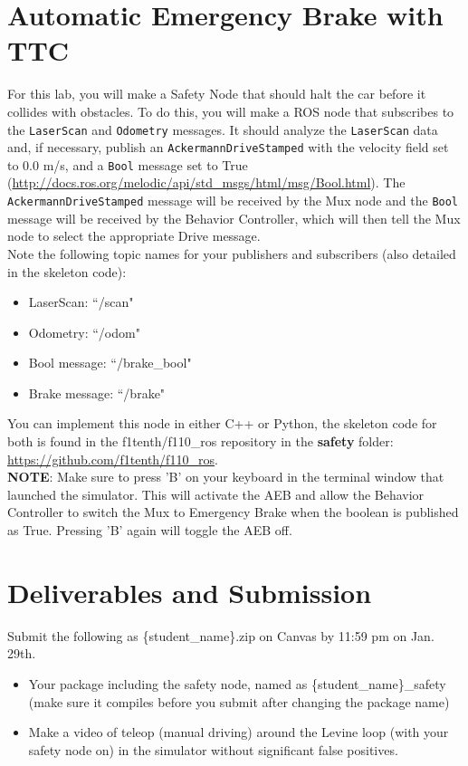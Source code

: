\documentclass[letter]{article}
\begin{document}
\section{Automatic Emergency Brake with TTC}
For this lab, you will make a Safety Node that should halt the car before it collides with obstacles. To do this, you will make a ROS node that subscribes to the \texttt{LaserScan} and \texttt{Odometry} messages. It should analyze the \texttt{LaserScan} data and, if necessary, publish an \texttt{AckermannDriveStamped} with the velocity field set to 0.0 m/s, and a \texttt{Bool} message set to True (\href{http://docs.ros.org/melodic/api/std_msgs/html/msg/Bool.html}{http://docs.ros.org/melodic/api/std\_msgs/html/msg/Bool.html}). The \texttt{AckermannDriveStamped} message will be received by the Mux node and the \texttt{Bool} message will be received by the Behavior Controller, which will then tell the Mux node to select the appropriate Drive message.\\

Note the following topic names for your publishers and subscribers (also detailed in the skeleton code): 
\begin{itemize}
    \item LaserScan: ``/scan"
    \item Odometry: ``/odom"
    \item Bool message: ``/brake\_bool"
    \item Brake message: ``/brake"
\end{itemize}

You can implement this node in either C++ or Python, the skeleton code for both is found in the f1tenth/f110\_ros repository in the \textbf{safety} folder: \href{https://github.com/f1tenth/f110_ros}{https://github.com/f1tenth/f110\_ros}. \\

\textbf{NOTE}: Make sure to press 'B' on your keyboard in the terminal window that launched the simulator. This will activate the AEB and allow the Behavior Controller to switch the Mux to Emergency Brake when the boolean is published as True. Pressing 'B' again will toggle the AEB off.

\section{Deliverables and Submission}
Submit the following as \{student\_name\}.zip on Canvas by 11:59 pm on Jan. 29th.
\begin{itemize}
    \item Your package including the safety node, named as \{student\_name\}\_safety (make sure it compiles before you submit after changing the package name)
    \item Make a video of teleop (manual driving) around the Levine loop (with your safety node on) in the simulator without significant false positives.
\end{itemize}
\end{document}
